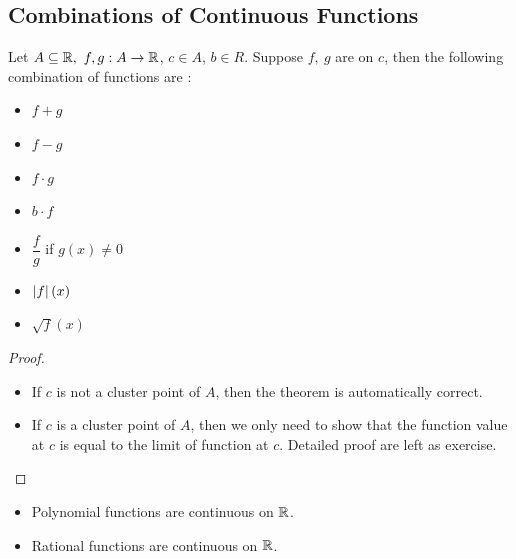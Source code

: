 \documentclass[a4paper,12pt]{article}
\begin{document}
\newpage
\subsection{Combinations of Continuous Functions}
\begin{theorem}
    Let \(A\subseteq\R,\ f,g:A\rightarrow\R\), \(c \in A\), \(b\in R\). Suppose \(f,\ g\) are  on \(c\), then the following combination of functions are :
    \begin{itemize}
        \item {} \(f+g\)
        \item {} \(f-g\)
        \item {} \(f\cdot g\)
        \item {} \(b\cdot f\)
        \item {} \(\dfrac{f }{g}\) if \(g(x)\neq 0\)
        \item {} \(\left\lvert f\right\rvert(x)\)
        \item {} \(\sqrt{f}(x)\)
    \end{itemize}
    \begin{proof}\ 
        \begin{itemize}
            \item If \(c\) is not a cluster point of \(A\), then the theorem is automatically correct.
            \item If \(c\) is a cluster point of \(A\), then we only need to show that the function value 
            at \(c\) is equal to the limit of function at \(c\). Detailed proof are left as exercise.
        \end{itemize}
    \end{proof}
\end{theorem}
\begin{example}
    \begin{itemize}\ 
        \item Polynomial functions are continuous on \(\mathbb{R}\). 
        \item Rational functions are continuous on \(\mathbb{R}\).\\
    \end{itemize}
\end{example}
\end{document}
